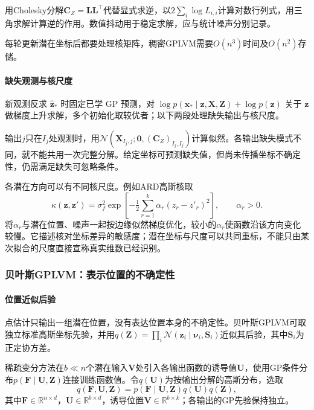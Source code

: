 用Cholesky分解$\bm{C}_Z=\bm{L}\bm{L}^\top$代替显式求逆，以$2\sum_i\log L_{i,i}$计算对数行列式，用三角求解计算逆的作用。数值抖动用于稳定求解，应与统计噪声分别记录。

每轮更新潜在坐标后都要处理核矩阵，稠密GPLVM需要$O(n^3)$时间及$O(n^2)$存储。

\paragraph{缺失观测与核尺度}

新观测反求 $\hat{\bm z}_*$ 时固定已学 GP 预测，对 $\log p(\bm x_*\mid\bm z,\bm X,\bm Z)+\log p(\bm z)$ 关于 $\bm z$ 做梯度上升求解，多个初始化取较优者；以下两段处理缺失输出与核尺度。



输出$j$只在$I_j$处观测时，用$\mathcal{N}(\bm{X}_{I_j,j};\bm{0},(\bm{C}_Z)_{I_j,I_j})$计算似然。各输出缺失模式不同，就不能共用一次完整分解。给定坐标可预测缺失值，但尚未传播坐标不确定性，仍需满足缺失可忽略条件。

各潜在方向可以有不同核尺度。例如ARD高斯核取
\[
 \kappa(\bm z,\bm z')=\sigma_f^2
 \exp\left[-\tfrac12\sum_{r=1}^k
             \alpha_r(z_r-z'_r)^2\right],\qquad \alpha_r>0.
\]
将$\alpha_r$与潜在位置、噪声一起按边缘似然梯度优化，较小的$\alpha_r$使函数沿该方向变化较慢。它描述核对坐标差异的敏感度；潜在坐标与尺度可以共同重标，不能只由某次拟合的尺度直接宣称真实维数已经识别。

\subsubsection{贝叶斯GPLVM：表示位置的不确定性}

\paragraph{位置近似后验}

点估计只输出一组潜在位置，没有表达位置本身的不确定性。贝叶斯GPLVM可取独立标准高斯坐标先验，并用$q(\bm Z)=\prod_i\mathcal N(\bm z_i\mid\bm\nu_i,\bm S_i)$近似其后验，其中$\bm S_i$为正定协方差。

稀疏变分方法在$b\ll n$个潜在输入$\bm V$处引入各输出函数的诱导值$\bm U$，使用GP条件分布$p(\bm F\mid\bm U,\bm Z)$连接训练函数值。令$q(\bm U)$为按输出分解的高斯分布，选取
\[
 q(\bm F,\bm U,\bm Z)
 =p(\bm F\mid\bm U,\bm Z)q(\bm U)q(\bm Z),
\]
其中$\bm F\in\mathbb R^{n\times d}$，$\bm U\in\mathbb R^{b\times d}$，诱导位置$\bm V\in\mathbb R^{b\times k}$；各输出的GP先验保持独立。

